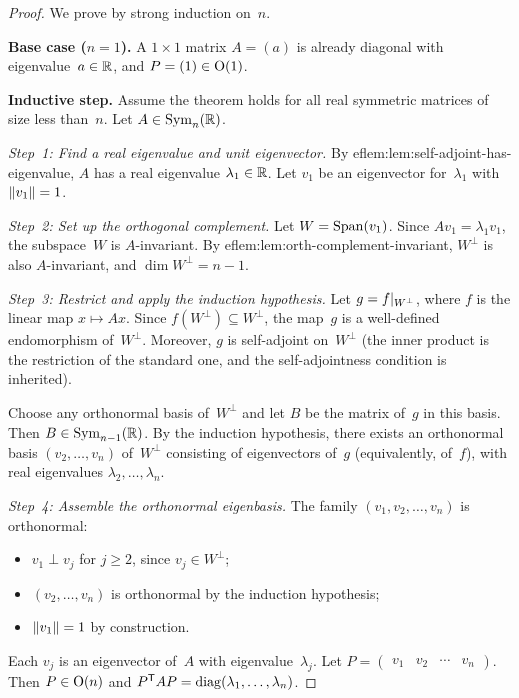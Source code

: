 \begin{proof}
We prove by strong induction on~$n$.

\medskip\noindent\textbf{Base case ($n=1$).}\quad
A $1\times 1$ matrix $A=(a)$ is already diagonal with
eigenvalue~$a\in{\mathbb{R}}$, and $P=(1)\in\operatorname{O}(1)$.

\medskip\noindent\textbf{Inductive step.}\quad
Assume the theorem holds for all real symmetric matrices of size less
than~$n$.  Let $A\in\operatorname{Sym}_n({\mathbb{R}})$.

\medskip\noindent\emph{Step~1: Find a real eigenvalue and unit eigenvector.}\quad
By 
ef{lem:lem:self-adjoint-has-eigenvalue}, $A$ has a real eigenvalue
$\lambda_1\in{\mathbb{R}}$.  Let $v_1$ be an eigenvector for~$\lambda_1$ with
$\lVert v_1\rVert=1$.

\medskip\noindent\emph{Step~2: Set up the orthogonal complement.}\quad
Let $W = \operatorname{Span}(v_1)$.  Since $A v_1 = \lambda_1 v_1$, the subspace~$W$
is $A$-invariant.  By 
ef{lem:lem:orth-complement-invariant}, $W^\perp$
is also $A$-invariant, and $\dim W^\perp = n-1$.

\medskip\noindent\emph{Step~3: Restrict and apply the induction hypothesis.}\quad
Let $g = f{|_{W^\perp}}$, where $f$ is the linear map
$x\mapsto Ax$.  Since $f(W^\perp)\subseteq W^\perp$, the map~$g$ is a
well-defined endomorphism of~$W^\perp$.  Moreover, $g$ is self-adjoint
on~$W^\perp$ (the inner product is the restriction of the standard one,
and the self-adjointness condition is inherited).

Choose any orthonormal basis of~$W^\perp$ and let $B$ be the matrix
of~$g$ in this basis.  Then $B\in\operatorname{Sym}_{n-1}({\mathbb{R}})$.  By the induction
hypothesis, there exists an orthonormal basis
$(v_2,\ldots,v_n)$ of~$W^\perp$ consisting of eigenvectors of~$g$
(equivalently, of~$f$), with real eigenvalues
$\lambda_2,\ldots,\lambda_n$.

\medskip\noindent\emph{Step~4: Assemble the orthonormal eigenbasis.}\quad
The family $(v_1,v_2,\ldots,v_n)$ is orthonormal:
\begin{itemize}
  \item $v_1\perp v_j$ for $j\geq 2$, since $v_j\in W^\perp$;
  \item $(v_2,\ldots,v_n)$ is orthonormal by the induction hypothesis;
  \item $\lVert v_1\rVert=1$ by construction.
\end{itemize}
Each $v_j$ is an eigenvector of~$A$ with eigenvalue~$\lambda_j$.
Let $P = \begin{pmatrix} v_1 & v_2 & \cdots & v_n \end{pmatrix}$.
Then $P\in\operatorname{O}(n)$ and ${P}^{\mathsf{T}}AP = \operatorname{diag}(\lambda_1,\ldots,\lambda_n)$.
\end{proof}

